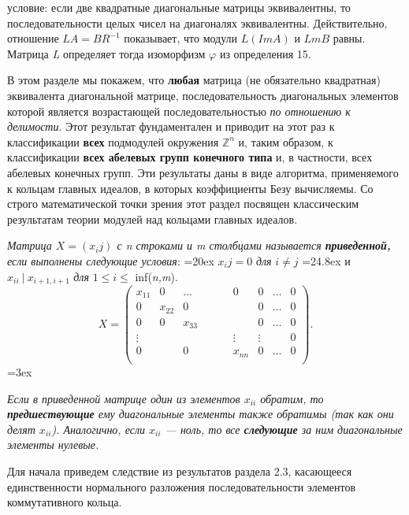 \pagebreak

\noindent условие: если две квадратные диагональные матрицы эквивалентны, то последовательности целых чисел на диагоналях эквивалентны. Действительно, отношение $L A = B R^{-1}$ показывает, что модули $L(Im A)$ и $Lm B$ равны. Матрица \textit{L} определяет тогда изоморфизм $\varphi$ из определения 15.

В этом разделе мы покажем, что \textbf{любая} матрица (не обязательно квадратная) эквивалента диагональной матрице, последовательность диагональных элементов которой является возрастающей последовательностью \textit{по отношению к делимости}. Этот результат фундаментален и приводит на этот раз к классификации \textbf{всех} подмодулей окружения $\mathbb{Z}^n$ и, таким образом, к классификации \textbf{всех абелевых групп конечного типа} и, в частности, всех абелевых конечных групп. Эти результаты даны в виде алгоритма, применяемого к кольцам главных идеалов, в которых коэффициенты Безу вычисляемы. Со строго математической точки зрения этот раздел посвящен классическим результатам теории модулей над кольцами главных идеалов.
\begin{determ}
\hspace*{0.5cm}

\textit{ Матрица $X = (x_ij)$ с n строками и m столбцами называется \textbf{приведенной,} если выполнены следующие условия}:
\parindent=20ex
$x_ij = 0$ \textit{для} $i \ne j$
\parindent=24.8ex
и $x_{ii} ~| ~ x_{i+1, i+1}$ \textit{для} $ 1 \leqslant i \leqslant $ inf(\textit{n,m}). \\
\[ X= \begin{pmatrix}
x_{11} & 0 & \dots & & & & 0 & 0 & \dots & 0\\
0 & x_{22} & 0 & & & & & 0 & \dots & 0 \\
0 & 0 & x_{33} & & & & & 0 & \dots & 0 \\
\vdots & & & & & & \vdots & \vdots & & 0 \\
0 & & 0 & & & & x_{nn} & 0 & \dots & 0 \\
\end{pmatrix}. 
\] 
\parindent=3ex

\textit{Если в приведенной матрице один из элементов $x_{ii}$ обратим, то \textbf{предшествующие} ему диагональные элементы также обратимы (так как они делят $x_{ii}$). Аналогично, если $x_{ii}$ — ноль, то все \textbf{следующие} за ним диагональные элементы нулевые.}
\end{determ}
Для начала приведем следствие из результатов раздела 2.3, касающееся единственности нормального разложения последовательности элементов коммутативного кольца.

